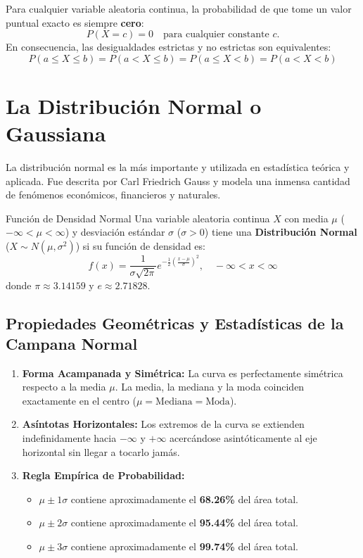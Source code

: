 \begin{alerta}
Para cualquier variable aleatoria continua, la probabilidad de que tome un valor puntual exacto es siempre \textbf{cero}:
\[
P(X = c) = 0 \quad \text{para cualquier constante } c.
\]
En consecuencia, las desigualdades estrictas y no estrictas son equivalentes:
\[
P(a \le X \le b) = P(a < X \le b) = P(a \le X < b) = P(a < X < b)
\]
\end{alerta}

\section{La Distribución Normal o Gaussiana}
La distribución normal es la más importante y utilizada en estadística teórica y aplicada. Fue descrita por Carl Friedrich Gauss y modela una inmensa cantidad de fenómenos económicos, financieros y naturales.

\begin{definicion}{Función de Densidad Normal}
Una variable aleatoria continua $X$ con media $\mu$ ($-\infty < \mu < \infty$) y desviación estándar $\sigma$ ($\sigma > 0$) tiene una \textbf{Distribución Normal} ($X \sim N(\mu, \sigma^2)$) si su función de densidad es:
\begin{equation}
    f(x) = \frac{1}{\sigma \sqrt{2\pi}} e^{-\frac{1}{2}\left(\frac{x - \mu}{\sigma}\right)^2}, \quad -\infty < x < \infty
\end{equation}
donde $\pi \approx 3.14159$ y $e \approx 2.71828$.
\end{definicion}

\subsection{Propiedades Geométricas y Estadísticas de la Campana Normal}
\begin{enumerate}
    \item \textbf{Forma Acampanada y Simétrica:} La curva es perfectamente simétrica respecto a la media $\mu$. La media, la mediana y la moda coinciden exactamente en el centro ($\mu = \text{Mediana} = \text{Moda}$).
    \item \textbf{Asíntotas Horizontales:} Los extremos de la curva se extienden indefinidamente hacia $-\infty$ y $+\infty$ acercándose asintóticamente al eje horizontal sin llegar a tocarlo jamás.
    \item \textbf{Regla Empírica de Probabilidad:}
    \begin{itemize}
        \item $\mu \pm 1\sigma$ contiene aproximadamente el \textbf{68.26\%} del área total.
        \item $\mu \pm 2\sigma$ contiene aproximadamente el \textbf{95.44\%} del área total.
        \item $\mu \pm 3\sigma$ contiene aproximadamente el \textbf{99.74\%} del área total.
    \end{itemize}
\end{enumerate}


